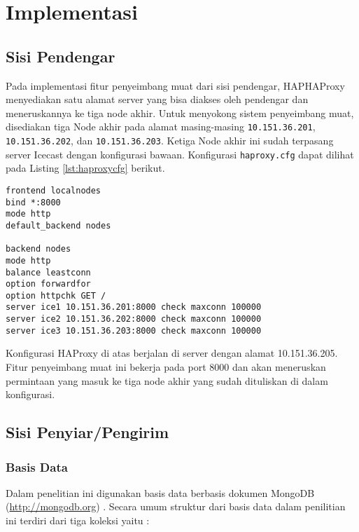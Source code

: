 \chapter{Implementasi}


\section{Sisi Pendengar}
Pada implementasi fitur penyeimbang muat dari sisi pendengar, HAPHAProxy menyediakan satu alamat server yang bisa diakses oleh pendengar dan meneruskannya ke tiga node akhir. Untuk menyokong sistem penyeimbang muat, disediakan tiga Node akhir pada alamat masing-masing \texttt{10.151.36.201}, \texttt{10.151.36.202}, dan \texttt{10.151.36.203}. Ketiga Node akhir ini sudah terpasang server Icecast dengan konfigurasi bawaan. Konfigurasi \texttt{haproxy.cfg} dapat dilihat pada Listing \ref{lst:haproxycfg} berikut.



\begin{lstlisting}[breaklines,frame=single]
frontend localnodes
bind *:8000
mode http
default_backend nodes

backend nodes
mode http
balance leastconn
option forwardfor
option httpchk GET /
server ice1 10.151.36.201:8000 check maxconn 100000
server ice2 10.151.36.202:8000 check maxconn 100000
server ice3 10.151.36.203:8000 check maxconn 100000

\end{lstlisting}

Konfigurasi HAProxy di atas berjalan di server dengan alamat 10.151.36.205. Fitur penyeimbang muat ini bekerja pada port 8000 dan akan meneruskan permintaan yang masuk ke tiga node akhir yang sudah dituliskan di dalam konfigurasi. 
\section{Sisi Penyiar/Pengirim}

\subsection{Basis Data}
Dalam penelitian ini digunakan basis data berbasis dokumen MongoDB (\url{http://mongodb.org}) . Secara umum struktur dari basis data dalam penilitian ini terdiri dari tiga koleksi yaitu :

